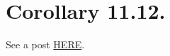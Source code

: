 
\section{Corollary 11.12.}

See a post \href{https://math.stackexchange.com/questions/3498733/every-prime-ideal-has-finite-height-in-a-noetherian-ring}{HERE}.